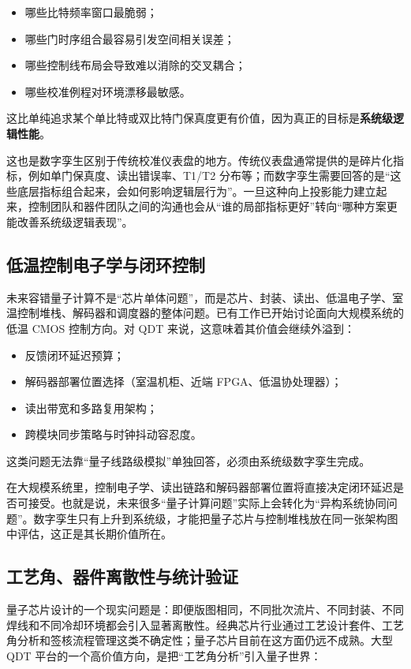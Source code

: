 \documentclass[11pt,a4paper]{article}
\newcommand{\QDT}{QDT}
\begin{document}
\begin{itemize}
  \item 哪些比特频率窗口最脆弱；
  \item 哪些门时序组合最容易引发空间相关误差；
  \item 哪些控制线布局会导致难以消除的交叉耦合；
  \item 哪些校准例程对环境漂移最敏感。
\end{itemize}

这比单纯追求某个单比特或双比特门保真度更有价值，因为真正的目标是\textbf{系统级逻辑性能}。

这也是数字孪生区别于传统校准仪表盘的地方。传统仪表盘通常提供的是碎片化指标，例如单门保真度、读出错误率、T1/T2 分布等；而数字孪生需要回答的是“这些底层指标组合起来，会如何影响逻辑层行为”。一旦这种向上投影能力建立起来，控制团队和器件团队之间的沟通也会从“谁的局部指标更好”转向“哪种方案更能改善系统级逻辑表现”。

\subsection{低温控制电子学与闭环控制}

未来容错量子计算不是“芯片单体问题”，而是芯片、封装、读出、低温电子学、室温控制堆栈、解码器和调度器的整体问题。已有工作已开始讨论面向大规模系统的低温 CMOS 控制方向。对 \QDT{} 来说，这意味着其价值会继续外溢到：

\begin{itemize}
  \item 反馈闭环延迟预算；
  \item 解码器部署位置选择（室温机柜、近端 FPGA、低温协处理器）；
  \item 读出带宽和多路复用架构；
  \item 跨模块同步策略与时钟抖动容忍度。
\end{itemize}

这类问题无法靠“量子线路级模拟”单独回答，必须由系统级数字孪生完成。

在大规模系统里，控制电子学、读出链路和解码器部署位置将直接决定闭环延迟是否可接受。也就是说，未来很多“量子计算问题”实际上会转化为“异构系统协同问题”。数字孪生只有上升到系统级，才能把量子芯片与控制堆栈放在同一张架构图中评估，这正是其长期价值所在。

\subsection{工艺角、器件离散性与统计验证}

量子芯片设计的一个现实问题是：即便版图相同，不同批次流片、不同封装、不同焊线和不同冷却环境都会引入显著离散性。经典芯片行业通过工艺设计套件、工艺角分析和签核流程管理这类不确定性；量子芯片目前在这方面仍远不成熟。大型 \QDT{} 平台的一个高价值方向，是把“工艺角分析”引入量子世界：
\end{document}
